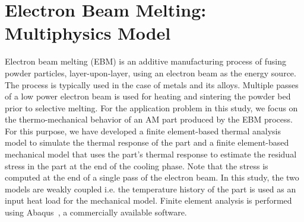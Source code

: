 \section{Electron Beam Melting: Multiphysics Model}
\label{sec:model}

Electron beam melting (EBM) is an additive manufacturing process of fusing powder particles, layer-upon-layer, 
using an electron beam as the energy source. The process is typically used in the case of metals and its alloys.
Multiple passes of  a low power electron beam is used for heating and sintering the powder bed prior to selective
melting. For the application problem in this study, we focus on the thermo-mechanical behavior of an AM part
produced by the EBM process. For this purpose, we have developed a finite element-based thermal analysis
model to simulate the thermal response of the part and a finite element-based mechanical model that uses
the part's thermal
response to estimate the residual stress in the part at the end of the cooling phase. Note that the stress is computed
at the end of a single pass of the electron beam. In this study, the two models are
weakly coupled i.e. the temperature history of the part is used as an input heat load for the mechanical model. 
Finite element analysis is performed using Abaqus~\cite{Hibbitt:2001}, a commercially available software. 

